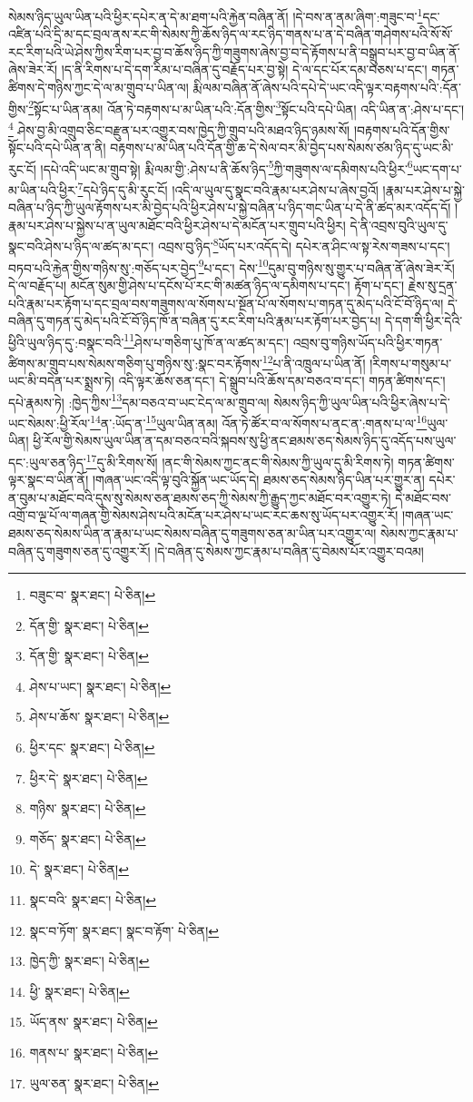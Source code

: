སེམས་ཉིད་ཡུལ་ཡིན་པའི་ཕྱིར་དཔེར་ན་དེ་མ་ཐག་པའི་རྐྱེན་བཞིན་ནོ། །དེ་བས་ན་ནམ་ཞིག་:གཟུང་བ་\footnote{བཟུང་བ་  སྣར་ཐང་།  པེ་ཅིན། }དང་འཛིན་པའི་དྲི་མ་དང་བྲལ་ནས་རང་གི་སེམས་ཀྱི་ཆོས་ཉིད་ལ་རང་ཉིད་གནས་པ་ན་དེ་བཞིན་གཤེགས་པའི་སོ་སོ་རང་རིག་པའི་ཡེ་ཤེས་ཀྱིས་རིག་པར་བྱ་བ་ཆོས་ཉིད་ཀྱི་གཟུགས་ཞེས་བྱ་བ་དེ་རྟོགས་པ་ནི་བསྒྲུབ་པར་བྱ་བ་ཡིན་ནོ་ཞེས་ཟེར་རོ། །ད་ནི་རིགས་པ་དེ་དག་རིམ་པ་བཞིན་དུ་བརྗོད་པར་བྱ་སྟེ། དེ་ལ་དང་པོར་དམ་བཅས་པ་དང་། གཏན་ཚིགས་དེ་གཉིས་ཀྱང་དེ་ལ་མ་གྲུབ་པ་ཡིན་ལ། རྨི་ལམ་བཞིན་ནོ་ཞེས་པའི་དཔེ་དེ་ཡང་འདི་ལྟར་བརྟགས་པའི་:དོན་གྱིས་\footnote{དོན་གྱི་  སྣར་ཐང་།  པེ་ཅིན། }སྟོང་པ་ཡིན་ནམ། འོན་ཏེ་བརྟགས་པ་མ་ཡིན་པའི་:དོན་གྱིས་\footnote{དོན་གྱི་  སྣར་ཐང་།  པེ་ཅིན། }སྟོང་པའི་དཔེ་ཡིན། འདི་ཡིན་ན་:ཤེས་པ་དང་།\footnote{ཤེས་པ་ཡང་།  སྣར་ཐང་།  པེ་ཅིན། } ཤེས་བྱ་མི་འགྲུབ་ཅིང་བརྫུན་པར་འགྱུར་བས་ཁྱེད་ཀྱི་གྲུབ་པའི་མཐའ་ཉིད་ཉམས་སོ། །བརྟགས་པའི་དོན་གྱིས་སྟོང་པའི་དཔེ་ཡིན་ན་ནི། བརྟགས་པ་མ་ཡིན་པའི་དོན་གྱི་ཆ་དེ་སེལ་བར་མི་བྱེད་པས་སེམས་ཙམ་ཉིད་དུ་ཡང་མི་རུང་ངོ། །དཔེ་འདི་ཡང་མ་གྲུབ་སྟེ། རྨི་ལམ་གྱི་:ཤེས་པ་ནི་ཆོས་ཉིད་\footnote{ཤེས་པ་ཆོས་  སྣར་ཐང་།  པེ་ཅིན། }ཀྱི་གཟུགས་ལ་དམིགས་པའི་ཕྱིར་\footnote{ཕྱིར་དང་  སྣར་ཐང་།  པེ་ཅིན། }ཡང་དག་པ་མ་ཡིན་པའི་ཕྱིར་\footnote{ཕྱིར་དེ་  སྣར་ཐང་།  པེ་ཅིན། }དཔེ་ཉིད་དུ་མི་རུང་ངོ། །འདི་ལ་ཡུལ་དུ་སྣང་བའི་རྣམ་པར་ཤེས་པ་ཞེས་བྱའོ། །རྣམ་པར་ཤེས་པ་སྐྱེ་བཞིན་པ་ཉིད་ཀྱི་ཡུལ་རྟོགས་པར་མི་བྱེད་པའི་ཕྱིར་ཤེས་པ་སྐྱེ་བཞིན་པ་ཉིད་གང་ཡིན་པ་དེ་ནི་ཚད་མར་འདོད་དོ། །རྣམ་པར་ཤེས་པ་སྐྱེས་པ་ན་ཡུལ་མཐོང་བའི་ཕྱིར་ཤེས་པ་དེ་མངོན་པར་གྲུབ་པའི་ཕྱིར། དེ་ནི་འབྲས་བུའི་ཡུལ་དུ་སྣང་བའི་ཤེས་པ་ཉིད་ལ་ཚད་མ་དང་། འབྲས་བུ་ཉིད་\footnote{གཉིས་  སྣར་ཐང་།  པེ་ཅིན། }ཡོད་པར་འདོད་དེ། དཔེར་ན་ཤིང་ལ་སྟ་རེས་གཟས་པ་དང་། བཏབ་པའི་རྐྱེན་གྱིས་གཉིས་སུ་:གཅོད་པར་བྱེད་\footnote{གཅོད་  སྣར་ཐང་།  པེ་ཅིན། }པ་དང་། དེས་\footnote{དེ་  སྣར་ཐང་།  པེ་ཅིན། }དུམ་བུ་གཉིས་སུ་གྱུར་པ་བཞིན་ནོ་ཞེས་ཟེར་རོ། དེ་ལ་བརྗོད་པ། མངོན་སུམ་གྱི་ཤེས་པ་དངོས་པོ་རང་གི་མཚན་ཉིད་ལ་དམིགས་པ་དང་། རྟོག་པ་དང་། རྗེས་སུ་དྲན་པའི་རྣམ་པར་རྟོག་པ་དང་བྲལ་བས་གཟུགས་ལ་སོགས་པ་སྔོན་པོ་ལ་སོགས་པ་གཏན་དུ་མེད་པའི་ངོ་བོ་ཉིད་ལ། དེ་བཞིན་དུ་གཏན་དུ་མེད་པའི་ངོ་བོ་ཉིད་ཁོ་ན་བཞིན་དུ་རང་རིག་པའི་རྣམ་པར་རྟོག་པར་བྱེད་པ། དེ་དག་གི་ཕྱིར་དེའི་ཕྱིའི་ཡུལ་ཉིད་དུ་:བསྣང་བའི་\footnote{སྣང་བའི་  སྣར་ཐང་།  པེ་ཅིན། }ཤེས་པ་གཅིག་པུ་ཁོ་ན་ལ་ཚད་མ་དང་། འབྲས་བུ་གཉིས་ཡོད་པའི་ཕྱིར་གཏན་ཚིགས་མ་གྲུབ་པས་སེམས་གཅིག་པུ་གཉིས་སུ་:སྣང་བར་རྟོགས་\footnote{སྣང་བ་ཏོག་  སྣར་ཐང་། སྣང་བ་རྟོག་  པེ་ཅིན། }པ་ནི་འཁྲུལ་པ་ཡིན་ནོ། །རིགས་པ་གསུམ་པ་ཡང་མི་བདེན་པར་སྨྲས་ཏེ། འདི་ལྟར་ཆོས་ཅན་དང་། དེ་སྒྲུབ་པའི་ཆོས་དམ་བཅའ་བ་དང་། གཏན་ཚིགས་དང་། དཔེ་རྣམས་ཏེ། :ཁྱེད་ཀྱིས་\footnote{ཁྱེད་ཀྱི་  སྣར་ཐང་།  པེ་ཅིན། }དམ་བཅའ་བ་ཡང་ངེད་ལ་མ་གྲུབ་ལ། སེམས་ཉིད་ཀྱི་ཡུལ་ཡིན་པའི་ཕྱིར་ཞེས་པ་དེ་ཡང་སེམས་:ཕྱི་རོལ་\footnote{ཕྱི་  སྣར་ཐང་།  པེ་ཅིན། }ན་:ཡོད་ན་\footnote{ཡོད་ནས་  སྣར་ཐང་།  པེ་ཅིན། }ཡུལ་ཡིན་ནམ། འོན་ཏེ་ཚོར་བ་ལ་སོགས་པ་ནང་ན་:གནས་པ་ལ་\footnote{གནས་པ་  སྣར་ཐང་།  པེ་ཅིན། }ཡུལ་ཡིན། ཕྱི་རོལ་གྱི་སེམས་ཡུལ་ཡིན་ན་དམ་བཅའ་བའི་སྐབས་སུ་ཕྱི་ནང་ཐམས་ཅད་སེམས་ཉིད་དུ་འདོད་པས་ཡུལ་དང་:ཡུལ་ཅན་ཉིད་\footnote{ཡུལ་ཅན་  སྣར་ཐང་།  པེ་ཅིན། }དུ་མི་རིགས་སོ། །ནང་གི་སེམས་ཀྱང་ནང་གི་སེམས་ཀྱི་ཡུལ་དུ་མི་རིགས་ཏེ། གཏན་ཚིགས་ལྟར་སྣང་བ་ཡིན་ནོ། །གཞན་ཡང་འདི་ལྟ་བུའི་སྐྱོན་ཡང་ཡོད་དེ། ཐམས་ཅད་སེམས་ཉིད་ཡིན་པར་གྱུར་ན། དཔེར་ན་བུམ་པ་མཐོང་བའི་དུས་སུ་སེམས་ཅན་ཐམས་ཅད་ཀྱི་སེམས་ཀྱི་རྒྱུད་ཀྱང་མཐོང་བར་འགྱུར་ཏེ། དེ་མཐོང་བས་འགྲོ་བ་ལྔ་པོ་ལ་གཞན་གྱི་སེམས་ཤེས་པའི་མངོན་པར་ཤེས་པ་ཡང་རང་ཆས་སུ་ཡོད་པར་འགྱུར་རོ། །གཞན་ཡང་ཐམས་ཅད་སེམས་ཡིན་ན་རྣམ་པ་ཡང་སེམས་བཞིན་དུ་གཟུགས་ཅན་མ་ཡིན་པར་འགྱུར་ལ། སེམས་ཀྱང་རྣམ་པ་བཞིན་དུ་གཟུགས་ཅན་དུ་འགྱུར་རོ། །དེ་བཞིན་དུ་སེམས་ཀྱང་རྣམ་པ་བཞིན་དུ་བེམས་པོར་འགྱུར་བའམ། 